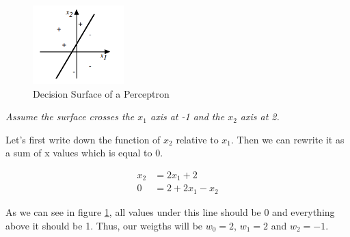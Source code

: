 \documentclass{article}
\begin{document}
\begin{figure}
\begin{center}
	\includegraphics[width=100pt]{perceptron1.png}
\end{center}
	\caption{Decision Surface of a Perceptron}
	\label{fig:perc}
\end{figure}

\textit{Assume the surface crosses the $x_1$ axis at -1 and the $x_2$ axis at 2.}

Let's first write down the function of $x_2$ relative to $x_1$. Then we can rewrite it as a sum of x values which is equal to 0.

\begin{align*}
x_2 &= 2x_1 + 2\\
0&=2+2x_1-x_2
\end{align*}

As we can see in figure \ref{fig:perc}, all values under this line should be 0 and everything above it should be 1. Thus, our weigths will be $w_0 = 2$, $w_1 = 2$ and $w_2 = -1$.
\end{document}
